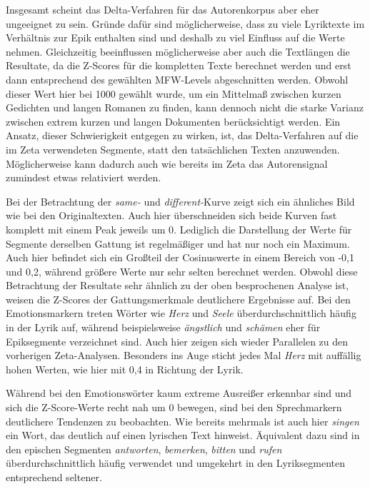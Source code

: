 \documentclass[a4paper,10p]{article}
\begin{document}
Insgesamt scheint das Delta-Verfahren für das Autorenkorpus aber eher ungeeignet zu sein. Gründe dafür sind möglicherweise, dass zu viele Lyriktexte im Verhältnis zur Epik enthalten sind und deshalb zu viel Einfluss auf die Werte nehmen. Gleichzeitig beeinflussen möglicherweise aber auch die Textlängen die Resultate, da die Z-Scores für die kompletten Texte berechnet werden und erst dann entsprechend des gewählten MFW-Levels abgeschnitten werden. Obwohl dieser Wert hier bei 1000 gewählt wurde, um ein Mittelmaß zwischen kurzen Gedichten und langen Romanen zu finden, kann dennoch nicht die starke Varianz zwischen extrem kurzen und langen Dokumenten berücksichtigt werden. Ein Ansatz, dieser Schwierigkeit entgegen zu wirken, ist, das Delta-Verfahren auf die im Zeta verwendeten Segmente, statt den tatsächlichen Texten anzuwenden. Möglicherweise kann dadurch auch wie bereits im Zeta das Autorensignal zumindest etwas relativiert werden. \par                 

Bei der Betrachtung der \textit{same-} und  \textit{different-}Kurve zeigt sich ein ähnliches Bild wie bei den Originaltexten. Auch hier überschneiden sich beide Kurven fast komplett mit einem Peak jeweils um 0. Lediglich die Darstellung der Werte für Segmente derselben Gattung ist regelmäßiger und hat nur noch ein Maximum. Auch hier befindet sich ein Großteil der Cosinuswerte in einem Bereich von -0,1 und 0,2, während größere Werte nur sehr selten berechnet werden. Obwohl diese Betrachtung der Resultate sehr ähnlich zu der oben besprochenen Analyse ist, weisen die Z-Scores der Gattungsmerkmale deutlichere Ergebnisse auf. Bei den Emotionsmarkern treten Wörter wie \textit{Herz} und \textit{Seele} überdurchschnittlich häufig in der Lyrik auf, während beispielsweise \textit{ängstlich} und \textit{schämen} eher für Epiksegmente verzeichnet sind. Auch hier zeigen sich wieder Parallelen zu den vorherigen Zeta-Analysen. Besonders ins Auge sticht jedes Mal \textit{Herz} mit auffällig hohen Werten, wie hier mit 0,4 in Richtung der Lyrik. \par 

Während bei den Emotionswörter kaum extreme Ausreißer erkennbar sind und sich die Z-Score-Werte recht nah um 0 bewegen, sind bei den Sprechmarkern deutlichere Tendenzen zu beobachten. Wie bereits mehrmals ist auch hier \textit{singen} ein Wort, das deutlich auf einen lyrischen Text hinweist. Äquivalent dazu sind in den epischen Segmenten \textit{antworten}, \textit{bemerken}, \textit{bitten} und \textit{rufen} überdurchschnittlich häufig verwendet und umgekehrt in den Lyriksegmenten entsprechend seltener. \par 
\end{document}
